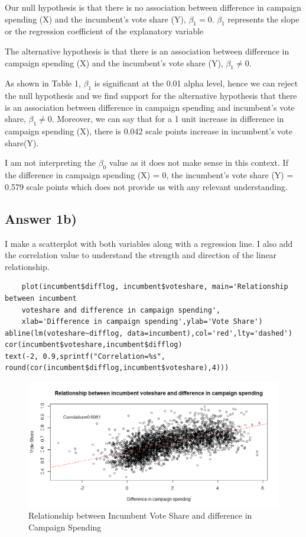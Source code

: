 \documentclass{article}
\begin{document}
\vspace{0.3cm}

\noindent Our null hypothesis is that there is no association between difference in campaign spending (X) and the incumbent's vote share (Y), $\beta_1 = 0$. $\beta_1$ represents the slope or the regression coefficient of the explanatory variable

The alternative hypothesis is that there is an association between difference in campaign spending (X) and the incumbent's vote share (Y), $\beta_1 \neq 0$.

As shown in Table 1, $\beta_1$ is significant at the 0.01 alpha level, hence we can reject the null hypothesis and we find support for the alternative hypothesis that there is an association between difference in campaign spending and incumbent's vote share, $\beta_1 \neq 0$. 
Moreover, we can say that for a 1 unit increase in difference in campaign spending (X), there is 0.042 scale points increase in incumbent's vote share(Y).

\noindent I am not interpreting the $\beta_0$ value as it does not make sense in this context. If the difference in campaign spending (X) = 0, the incumbent's vote share (Y) = 0.579 scale points which does not provide us with any relevant understanding.

\subsection{Answer 1b)}
I make a scatterplot with both variables along with a regression line.
I also add the correlation value to understand the strength and direction of the linear relationship.
\begin{verbatim}
    plot(incumbent$difflog, incumbent$voteshare, main='Relationship between incumbent 
    voteshare and difference in campaign spending',
    xlab='Difference in campaign spending',ylab='Vote Share')
abline(lm(voteshare~difflog, data=incumbent),col='red',lty='dashed') 
cor(incumbent$voteshare,incumbent$difflog)
text(-2, 0.9,sprintf("Correlation=%s",
round(cor(incumbent$difflog,incumbent$voteshare),4)))
\end{verbatim}

\begin{figure}[h!] %
    \centering
    \includegraphics[width=1.3\textwidth]{Q1PS3.png}
    \caption{Relationship between Incumbent Vote Share and difference in 
    Campaign Spending}
    \label{}
\end{figure}
\end{document}
